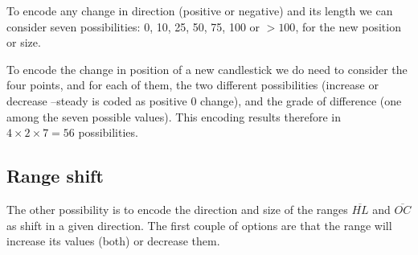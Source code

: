 \documentclass[]{article}
\begin{document}
\begin{center}
\end{center}

To encode any change in direction (positive or negative) and its length we can consider seven possibilities: 0, 10, 25, 50, 75, 100 or  $>100$, for the new position or size.

To encode the change in position of a new candlestick we do need to consider the four points, and for each of them, the two different possibilities (increase or decrease --steady is coded as positive 0 change), and the grade of difference (one among the seven possible values). This encoding results therefore in $4 \times 2 \times 7 = 56$ possibilities.

\subsection{Range shift}

The other possibility is to encode the direction and size of the ranges $\overline{HL}$ and $\overline{OC}$ as shift in a given direction. The first couple of options are that the range will increase its values (both) or decrease them.
\end{document}
